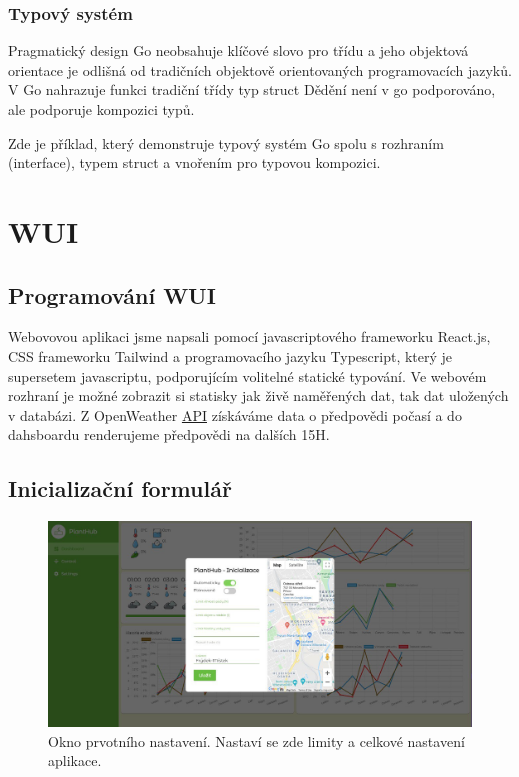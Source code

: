 \documentclass[12pt,a4paper]{article}
\begin{document}
\subsubsection{Typový systém}

Pragmatický design Go neobsahuje klíčové slovo pro třídu a jeho objektová orientace je odlišná od tradičních objektově orientovaných programovacích jazyků. V Go nahrazuje funkci tradiční třídy typ struct Dědění není v go podporováno, ale podporuje kompozici typů.

Zde je příklad, který demonstruje typový systém Go spolu s rozhraním (interface), typem struct a vnořením pro typovou kompozici.


\clearpage


\section{WUI}

\subsection{Programování WUI}

Webovovou aplikaci jsme napsali pomocí javascriptového frameworku
React.js, CSS frameworku Tailwind a programovacího jazyku Typescript, který je supersetem javascriptu, podporujícím volitelné statické typování. Ve webovém rozhraní je možné zobrazit si statisky jak živě naměřených dat, tak dat uložených v databázi. Z OpenWeather \underline{\ac{API}} získáváme data o předpovědi počasí a do dahsboardu renderujeme předpovědi na dalších 15H.

\subsection{Inicializační formulář}

\begin{figure}[h]
	\centering
	\includegraphics[width=\linewidth]{ui-inicializace.jpg}
	\caption{Okno prvotního nastavení. Nastaví se zde limity a celkové
		nastavení aplikace.}
\end{figure}
\end{document}
